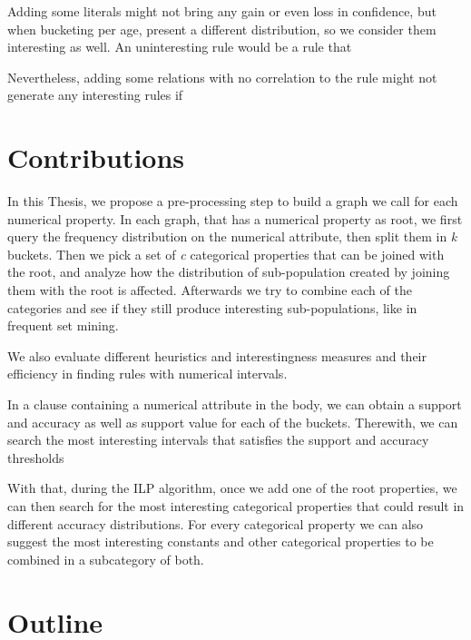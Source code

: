 Adding some literals might not bring any gain or even loss in confidence, but when bucketing per age, present a
different distribution, so we consider them interesting as well. An uninteresting rule would be a rule that 

Nevertheless, adding some relations with no correlation to the rule might not generate any interesting rules if  

\section{Contributions}
In this Thesis, we propose a pre-processing step to build a graph we call \graphname for each numerical property. In
each graph, that has a numerical property as root, we first query the frequency distribution on the numerical attribute,
then split them in \emph{k} buckets. Then we pick a set of \emph{c} categorical properties that can be joined with the
root, and analyze how the distribution of sub-population created by joining them with the root is affected. Afterwards
we try to combine each of the categories and see if they still produce interesting sub-populations, like in frequent set
mining.

We also evaluate different heuristics and interestingness measures and their efficiency in finding rules with
numerical intervals. 

In a clause containing a numerical attribute in the body, we can obtain a support and accuracy as well as support value
for each of the buckets. Therewith, we can search the most interesting intervals that satisfies the support and accuracy
thresholds

With that, during the ILP algorithm, once we add one of the root properties, we can then search for the most interesting
categorical properties that could result in different accuracy distributions. For every categorical property we can also
suggest the most interesting constants and other categorical properties to be combined in a subcategory of both.

\section{Outline}

\begin{comment}
 The remainder of this thesis is structured as follows. In
Chapter~\ref{ch:technical_background}, we provide technical background on
MapReduce and BigTable. In Chapter~\ref{ch:related_work}, we present a
summary of previous work in the areas of duplicate and near-duplicate detection,
information retrieval on web archives, and MapReduce applications in graph
processing. Following that, we state our problem and describe solutions in
Chapter~\ref{ch:redundancy_control}. In Chapter~\ref{ch:mapreduce_impl}, we
describe an implementation of our solution using the MapReduce framework. In
Chapter~\ref{ch:experiments}, we present our experimental results. We conclude
this thesis and outline directions of future research in Chapter~\ref{ch:future_work}.
\end{comment}
